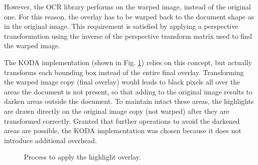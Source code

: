 \documentclass[a4paper]{article}
\begin{document}
However, the OCR library performs on the warped image, instead of the original one. For this reason, the overlay has to be warped back to the document shape as in the original image. This requirement is satisfied by applying a perspective transformation using the inverse of the perspective transform matrix used to find the warped image. 

The KODA implementation (shown in Fig. \ref{fig:keywordhighliting}) relies on this concept, but actually transforms each bounding box instead of the entire final overlay. Transforming the warped image copy (final overlay) would leads to black pixels all over the areas the document is not present, so that adding to the original image results to darken areas outside the document. To maintain intact these areas, the highlights are drawn directly on the original image copy (not warped) after they are transformed correctly. Granted that further operations to avoid the darkened areas are possible, the KODA implementation was chosen because it does not introduce additional overhead.

\begin{figure}[H]
	\caption{Process to apply the highlight overlay.}
	\label{fig:keywordhighliting}
\end{figure}
\end{document}
